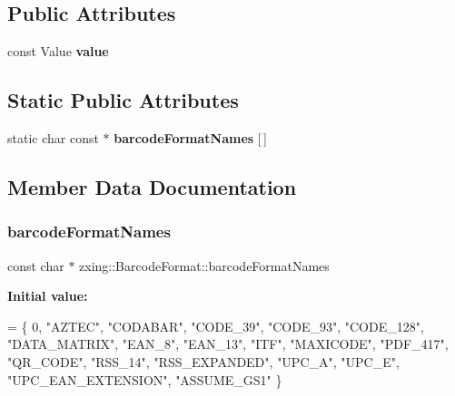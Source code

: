 \subsection*{Public Attributes}
\begin{DoxyCompactItemize}
\item 
\mbox{\label{classzxing_1_1_barcode_format_a94f2fb679e2460b9537d4ba5bbf771df}} 
const Value {\bfseries value}
\end{DoxyCompactItemize}
\subsection*{Static Public Attributes}
\begin{DoxyCompactItemize}
\item 
static char const  $\ast$ {\bfseries barcode\+Format\+Names} \mbox{[}$\,$\mbox{]}
\end{DoxyCompactItemize}


\subsection{Member Data Documentation}
\mbox{\label{classzxing_1_1_barcode_format_aefe66631455236bdb61cde1c6b2522db}} 
\subsubsection{\texorpdfstring{barcode\+Format\+Names}{barcodeFormatNames}}
{\footnotesize\ttfamily const char $\ast$ zxing\+::\+Barcode\+Format\+::barcode\+Format\+Names\hspace{0.3cm}{\ttfamily [static]}}

{\bfseries Initial value\+:}
\begin{DoxyCode}
= \{
  0,
  \textcolor{stringliteral}{"AZTEC"},
  \textcolor{stringliteral}{"CODABAR"},
  \textcolor{stringliteral}{"CODE\_39"},
  \textcolor{stringliteral}{"CODE\_93"},
  \textcolor{stringliteral}{"CODE\_128"},
  \textcolor{stringliteral}{"DATA\_MATRIX"},
  \textcolor{stringliteral}{"EAN\_8"},
  \textcolor{stringliteral}{"EAN\_13"},
  \textcolor{stringliteral}{"ITF"},
  \textcolor{stringliteral}{"MAXICODE"},
  \textcolor{stringliteral}{"PDF\_417"},
  \textcolor{stringliteral}{"QR\_CODE"},
  \textcolor{stringliteral}{"RSS\_14"},
  \textcolor{stringliteral}{"RSS\_EXPANDED"},
  \textcolor{stringliteral}{"UPC\_A"},
  \textcolor{stringliteral}{"UPC\_E"},
  \textcolor{stringliteral}{"UPC\_EAN\_EXTENSION"},
  \textcolor{stringliteral}{"ASSUME\_GS1"}
\}
\end{DoxyCode}


